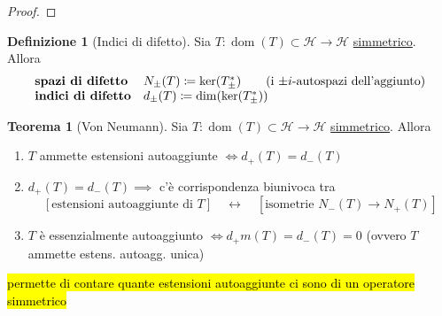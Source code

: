 \documentclass[a4paper,10pt]{article}
\theoremstyle{definition}
\DeclareMathOperator*{\dom}{dom} %
\newcommand{\hil}{\mathcal{H}} %
\theoremstyle{indentdefinition}
\newtheorem{defn}{Definizione}[section]
\theoremstyle{indenttheorem}
\newtheorem{thm}{Teorema}
\theoremstyle{myremark}
\theoremstyle{indentgeneral}
\newenvironment{myboxed} 
{\noindent\begin{lrbox}{\mybox}\begin{minipage}{\textwidth}}
{\end{minipage}\end{lrbox}\fbox{\usebox{\mybox}}}
\begin{document}
\begin{proof}\todo{}
\end{proof}

\begin{defn}[Indici di difetto] Sia $T:\dom(T)\subset\hil\to \hil$ \underline{simmetrico}. Allora
$$\begin{array}{ll}
\text{\textbf{spazi di difetto}} & N_\pm(T)\coloneqq \ker(T^*_\pm) \qquad \text{(i $\pm i$-autospazi dell'aggiunto)} \\
    \text{\textbf{indici di difetto}} & d_\pm(T)\coloneqq \dim(\ker(T^*_\pm)) 
\end{array}$$
    
\end{defn}

\begin{myboxed}
    \begin{thm}[Von Neumann]
        Sia $T:\dom(T)\subset\hil\to \hil$ \underline{simmetrico}. Allora
        \begin{enumerate}
            \item $T$ ammette estensioni autoaggiunte $\iff d_+(T)=d_-(T)$
            
            \item  $d_+(T)=d_-(T)\implies$ c'è corrispondenza biunivoca tra $$[\text{estensioni autoaggiunte di } T]\quad\longleftrightarrow\quad [\text{isometrie }N_-(T)\to N_+(T)]$$
            \item $T$ è essenzialmente autoaggiunto $\iff d_+m(T)=d_-(T)=0$ (ovvero $T$ ammette estens. autoagg. unica)
        \end{enumerate}
        \hl{permette di contare quante estensioni autoaggiunte ci sono di un operatore simmetrico}
    \end{thm}
\end{myboxed}
\end{document}
